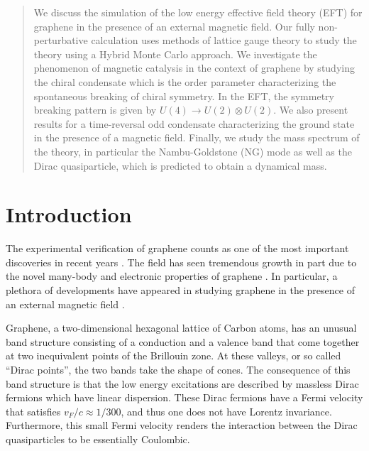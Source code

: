 \documentclass[aps,prd,twocolumn,showpacs,superscriptaddress,groupedaddress]{revtex4}  %
\begin{document}
\begin{abstract}
We discuss the simulation of the low energy effective field theory (EFT) for graphene in the presence of an external magnetic field. Our fully non-perturbative calculation 
uses methods of lattice gauge theory to study the theory using a Hybrid Monte Carlo approach. We investigate the phenomenon of magnetic catalysis in the context of graphene by studying
the chiral condensate which is the order parameter characterizing the spontaneous breaking of chiral symmetry. In the EFT, the symmetry breaking pattern is given by $U(4) \to U(2) \otimes U(2)$. We also present results for a time-reversal odd condensate characterizing the ground state in the presence of a magnetic field.
Finally, we study the mass spectrum of the theory, in particular the Nambu-Goldstone (NG) mode as well as the Dirac quasiparticle, which is predicted to obtain a dynamical mass. 
\end{abstract}

\pacs{}
\maketitle

\section{\label{sec:Intro}Introduction}
The experimental verification of graphene counts as one of the most important discoveries in recent years \cite{Novoselov}. The field has seen tremendous growth
in part due to the novel many-body and electronic properties of graphene \cite{CastroNeto}. In particular, a plethora of developments have appeared in studying graphene
in the presence of an external magnetic field \cite{Goerbig}.

Graphene, a two-dimensional hexagonal lattice of Carbon atoms, has an unusual band structure consisting of a conduction and a valence band that come together at two inequivalent points 
of the Brillouin zone. At these valleys, or so called ``Dirac points'', the two bands take the shape of cones. The consequence of this band structure is that the low energy excitations are described by massless Dirac fermions which have linear dispersion.
These Dirac fermions have a Fermi velocity that satisfies $v_F/c \approx 1/300$, and thus one does not have Lorentz invariance. Furthermore, this small Fermi velocity renders the interaction between the Dirac quasiparticles 
to be essentially Coulombic.
\end{document}
